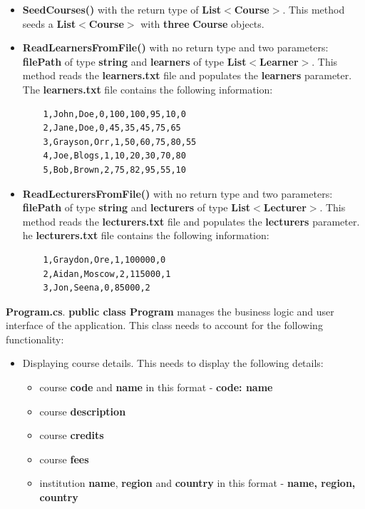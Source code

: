 \documentclass{article}
\begin{document}
\begin{itemize}
\begin{itemize}
\begin{itemize}
            \item \textbf{SeedCourses()} with the return type of \textbf{List$<$Course$>$}. This method seeds a \textbf{List$<$Course$>$} with \textbf{three} \textbf{Course} objects. 
            \item \textbf{ReadLearnersFromFile()} with no return type and two parameters: \textbf{filePath} of type \textbf{string} and \textbf{learners} of type \textbf{List$<$Learner$>$}. This method reads the \textbf{learners.txt} file and populates the \textbf{learners} parameter. The \textbf{learners.txt} file contains the following information:\\
            \begin{verbatim}
	1,John,Doe,0,100,100,95,10,0
	2,Jane,Doe,0,45,35,45,75,65
	3,Grayson,Orr,1,50,60,75,80,55
	4,Joe,Blogs,1,10,20,30,70,80
	5,Bob,Brown,2,75,82,95,55,10
            \end{verbatim}
            \item \textbf{ReadLecturersFromFile()} with no return type and two parameters: \textbf{filePath} of type \textbf{string} and \textbf{lecturers} of type \textbf{List$<$Lecturer$>$}. This method reads the \textbf{lecturers.txt} file and populates the \textbf{lecturers} parameter. he \textbf{lecturers.txt} file contains the following information:\\
            \begin{verbatim}
	1,Graydon,Ore,1,100000,0
	2,Aidan,Moscow,2,115000,1
	3,Jon,Seena,0,85000,2
            \end{verbatim}
        \end{itemize}
        \textbf{Program.cs}. \textbf{public class Program} manages the business logic and user interface of the application. This class needs to account for the following functionality:
        \begin{itemize}
            \item Displaying course details. This needs to display the following details:
            \begin{itemize}
                \item course \textbf{code} and \textbf{name} in this format - \textbf{code: name}
                \item course \textbf{description}
                \item course \textbf{credits}
                \item course \textbf{fees}
                \item institution \textbf{name}, \textbf{region} and \textbf{country} in this format - \textbf{name, region, country}

\end{itemize}
\end{itemize}
\end{itemize}
\end{itemize}
\end{document}
